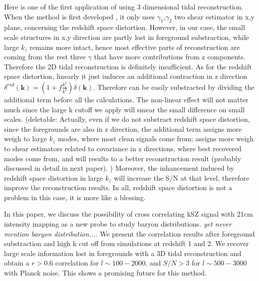 Here is one of the first application of using 3 dimensional tidal reconstruction. 
When the method is first developed \cite{2012:pen}\cite{2015:zhu}, 
it only uses $\gamma_1$,$\gamma_2$ two shear estimator in x,y plane, 
concerning the redshift space distortion. 
However, in our case, the small scale structures in x,y direction are partly lost in foreground substraction, while large $k_z$ remains more intact, 
hence most effective parts of reconstruction are coming from the rest three $\gamma$ that have more contributions from z components. 
Therefore the 2D tidal reconstruction is definitely insufficient. 
As for the redshift space distortion, 
linearly it just induces an additional contraction in z direction 
$\delta^{rsd}(\bm{k})=(1+f\frac{k_z^2}{k^2})\delta(\bm{k})$. 
Therefore can be easily substracted by dividing the additional term 
before all the calculations. 
The non-linear effect will not matter much since the large k cutoff we apply will smear 
the small difference on small scales. 
(deletable: 
Actually, even if we do not substract redshift space distortion, 
since the foregrounds are also in z direction, 
the additional term assigns more weigh to large $k_z$ modes, 
where most clean signals come from; 
assigns more weigh to shear estimators related to covariance in z directions, 
where best recovered modes come from, 
and will results to a better reconstruction result
(probably discussed in detail in next paper).
)
Moreover, the inhancement induced by redshift space distortion in large $k_z$ will increase the S/N at that level, 
therefore improve the reconstruction results. 
In all, redshift space distortion is not a problem in this case, 
it is more like a blessing. 


In this paper, we discuss the possibility of cross correlating kSZ signal with 
21cm intensity mapping as a new probe to study baryon distributions.
{\it yet never mention baryon distribution....} 
We present the correlation results after foreground substraction and high k cut off from simulations at redshift 1 and 2. 
We recover large scale information lost in foregrounds with a 3D tidal reconstruction and obtain a $r>0.6$ correlation for $l\sim100-2000$, 
and $S/N>3$ for $l\sim 500-3000$ with Planck noise. 
This shows a promising future for this method.
 
